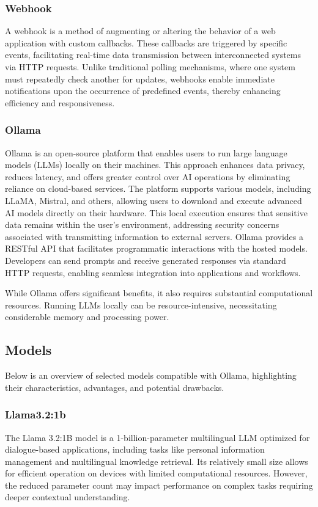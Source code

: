 \documentclass[12pt]{article}
\begin{document}
\subsubsection{Webhook}
A webhook is a method of augmenting or altering the behavior of a web application with custom callbacks. These callbacks are triggered by specific events, facilitating real-time data transmission between interconnected systems via HTTP requests. Unlike traditional polling mechanisms, where one system must repeatedly check another for updates, webhooks enable immediate notifications upon the occurrence of predefined events, thereby enhancing efficiency and responsiveness.

\subsubsection{Ollama}
Ollama is an open-source platform that enables users to run large language models (LLMs) locally on their machines. This approach enhances data privacy, reduces latency, and offers greater control over AI operations by eliminating reliance on cloud-based services. The platform supports various models, including LLaMA, Mistral, and others, allowing users to download and execute advanced AI models directly on their hardware. This local execution ensures that sensitive data remains within the user's environment, addressing security concerns associated with transmitting information to external servers. Ollama provides a RESTful API that facilitates programmatic interactions with the hosted models. Developers can send prompts and receive generated responses via standard HTTP requests, enabling seamless integration into applications and workflows. \cite{ollama}

While Ollama offers significant benefits, it also requires substantial computational resources. Running LLMs locally can be resource-intensive, necessitating considerable memory and processing power.

\subsection{Models}
Below is an overview of selected models compatible with Ollama, highlighting their characteristics, advantages, and potential drawbacks.

\subsubsection{Llama3.2:1b}
The Llama 3.2:1B model is a 1-billion-parameter multilingual LLM optimized for dialogue-based applications, including tasks like personal information management and multilingual knowledge retrieval. Its relatively small size allows for efficient operation on devices with limited computational resources. However, the reduced parameter count may impact performance on complex tasks requiring deeper contextual understanding. \cite{ollama}
\end{document}
